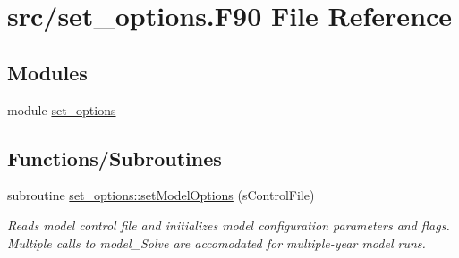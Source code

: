 \hypertarget{set__options_8_f90}{
\section{src/set\_\-options.F90 File Reference}
\label{set__options_8_f90}
}
\subsection*{Modules}
\begin{DoxyCompactItemize}
\item 
module \hyperlink{namespaceset__options}{set\_\-options}
\end{DoxyCompactItemize}
\subsection*{Functions/Subroutines}
\begin{DoxyCompactItemize}
\item 
subroutine \hyperlink{namespaceset__options_a9175270bec7efd77e8bd61c6df1f0269}{set\_\-options::setModelOptions} (sControlFile)
\begin{DoxyCompactList}\small\item\em Reads model control file and initializes model configuration parameters and flags. Multiple calls to model\_\-Solve are accomodated for multiple-\/year model runs. \item\end{DoxyCompactList}\end{DoxyCompactItemize}

